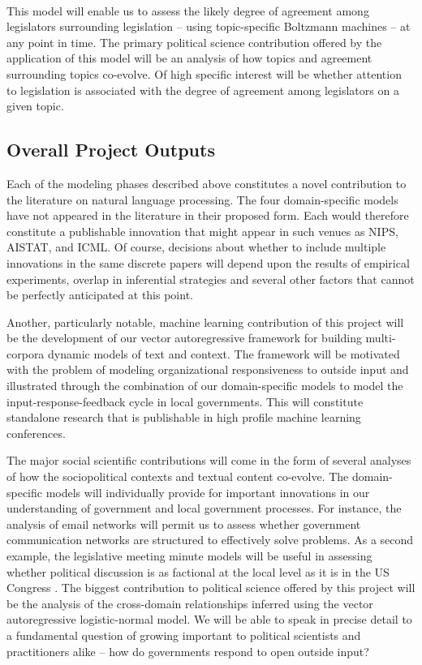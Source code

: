 ~\\
 This model will enable us to assess the likely degree of agreement among legislators surrounding legislation -- using topic-specific Boltzmann machines -- at any point in time. The primary political science contribution offered by the application of this model will be an analysis of how topics and agreement surrounding topics co-evolve. Of high specific interest will be whether attention to legislation is associated with the degree of agreement among legislators on a given topic. 




\subsection{Overall Project Outputs}

Each of the modeling phases described above constitutes a novel contribution to the literature on natural language processing. The four domain-specific models have not appeared in the literature in their proposed form. Each would therefore constitute a publishable innovation that might appear in such venues as NIPS, AISTAT, and ICML. Of course, decisions about whether to include multiple innovations in the same discrete papers will depend upon the results of empirical experiments, overlap in inferential strategies and several other factors that cannot be perfectly anticipated at this point.

Another, particularly notable, machine learning contribution of this project will be the development of our vector autoregressive framework for building multi-corpora dynamic models of text and context. The framework will be motivated with the problem of modeling organizational responsiveness to outside input and illustrated through the combination of our domain-specific models to model the input-response-feedback cycle in local governments. This will constitute standalone research that is publishable in high profile machine learning conferences.

The major social scientific contributions will come in the form of several analyses of how the sociopolitical contexts and textual content co-evolve. The domain-specific models will individually provide for important innovations in our understanding of government and local government processes. For instance, the analysis of email networks will permit us to assess whether government communication networks are structured to effectively solve problems. As a second example, the legislative meeting minute models will be useful in assessing whether political discussion is as factional at the local level as it is in the US Congress \cite{}. The biggest contribution to political science offered by this project will be the analysis of the cross-domain relationships inferred using the vector autoregressive logistic-normal model. We will be able to speak in precise detail to a fundamental question of growing important to political scientists and practitioners alike -- how do governments respond to open outside input? 

